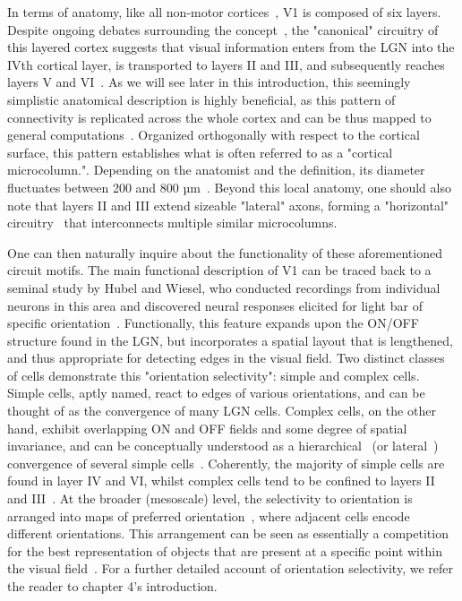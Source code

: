 In terms of anatomy, like all non-motor cortices~\cite{shipp2013reflections}, \gls{V1} is composed of six layers. Despite ongoing debates surrounding the concept~\cite{horton2005cortical}, the "canonical" circuitry of this layered cortex suggests that visual information enters from the \gls{LGN} into the IVth cortical layer, is transported to layers II and III, and subsequently reaches layers V and VI~\cite{binzegger2004quantitative,douglas2004neuronal}. As we will see later in this introduction, this seemingly simplistic anatomical description is highly beneficial, as this pattern of connectivity is replicated across the whole cortex and can be thus mapped to general computations~\cite{douglas1989canonical, bastos2012canonical}. Organized orthogonally with respect to the cortical surface, this pattern establishes what is often referred to as a "cortical microcolumn.". Depending on the anatomist and the definition, its diameter fluctuates between 200 and 800 µm~\cite{mountcastle1997columnar}. Beyond this local anatomy, one should also note that layers II and III extend sizeable "lateral" axons, forming a "horizontal" circuitry~\cite{angelucci2006contribution,chavane2011lateral} that interconnects multiple similar microcolumns.

One can then naturally inquire about the functionality of these aforementioned circuit motifs. The main functional description of \gls{V1} can be traced back to a seminal study by Hubel and Wiesel, who conducted recordings from individual neurons in this area and discovered neural responses elicited for light bar of specific orientation~\cite{hubel1959receptive, hubel1962receptive}. Functionally, this feature expands upon the ON/OFF structure found in the \gls{LGN}, but incorporates a spatial layout that is lengthened, and thus appropriate for detecting edges in the visual field. Two distinct classes of cells demonstrate this "orientation selectivity": simple and complex cells. Simple cells, aptly named, react to edges of various orientations, and can be thought of as the convergence of many \gls{LGN} cells. Complex cells, on the other hand, exhibit overlapping ON and OFF fields and some degree of spatial invariance, and can be conceptually understood as a hierarchical~\cite{hubel1962receptive} (or lateral~\cite{chance1999complex}) convergence of several simple cells~\cite{boutin2022pooling}. Coherently, the majority of simple cells are found in layer IV and VI, whilst complex cells tend to be confined to layers II and III~\cite{payne2001cat}.
At the broader (mesoscale) level, the selectivity to orientation is arranged into maps of preferred orientation~\cite{grinvald1986functional}, where adjacent cells encode different orientations. This arrangement can be seen as essentially a competition for the best representation of objects that are present at a specific point within the visual field~\cite{kastner2001neural}. For a further detailed account of orientation selectivity, we refer the reader to chapter 4's introduction.

